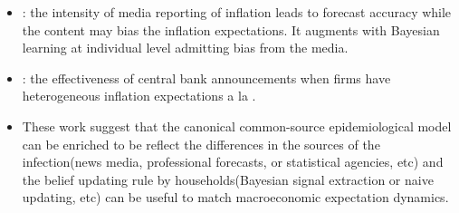 \begin{itemize}

	\item \href{http://www.sarah-lein.ch/pdfs/inflationexpectations.pdf}{\cite{lamla2014role}}:  the intensity of media reporting of inflation leads to forecast accuracy while the content may bias the inflation expectations.  It augments \cite{carroll2003macroeconomic} with Bayesian learning at individual level admitting bias from the media. %
	\item \href{https://github.com/iworld1991/EpiExp/blob/master/Literature/hachem_inflation_2017.pdf}{\cite{hachem_inflation_2017}}:  the effectiveness of central bank announcements when firms have heterogeneous inflation expectations a la \cite{carroll2003macroeconomic}.
	\item These work suggest that the canonical common-source epidemiological model can be enriched to be reflect the differences in the sources of the infection(news media, professional forecasts, or statistical agencies, etc) and the belief updating rule by households(Bayesian signal extraction or naive updating, etc) can be useful to match macroeconomic expectation dynamics.
\end{itemize}